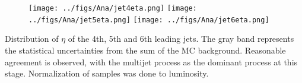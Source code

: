 \begin{frame}{}
\vspace{-.2cm}
\begin{figure}[!Hhtbp]
  \begin{center}
    \texttt{[image: ../figs/Ana/jet4eta.png]}
    \texttt{[image: ../figs/Ana/jet5eta.png]}
    \texttt{[image: ../figs/Ana/jet6eta.png]}
  \end{center}
\end{figure}

\vspace{-.2cm}
    \begin{block}{}
      \tiny \centering Distribution of $\eta$ of the 4th, 5th and 6th leading jets. The gray band represents the statistical uncertainties from the sum of the MC background. Reasonable agreement is observed, with the multijet process as the dominant process at this stage. Normalization of samples was done to luminosity.
    \end{block}

\end{frame}

